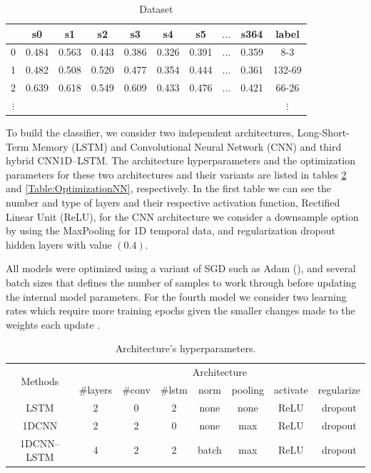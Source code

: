 \begin{table}[h]
	\centering
	\small
	\begin{tabular}[h]{|c|c|c|c|c|c|c|c|c|c|}
		\hline
		  & s0    & s1    & s2    & s3    & s4    &	s5    & $\ldots$ & s364  &   label \\ \hline
		0 & 0.484 & 0.563 & 0.443 & 0.386 & 0.326 &	0.391 & $\ldots$ & 0.359 &   8-3 \\
		1 &	0.482 &	0.508 &	0.520 &	0.477 &	0.354 &	0.444 & $\ldots$ & 0.361 & 132-69 \\
		2 &	0.639 & 0.618 &	0.549 &	0.609 &	0.433 & 0.476 & $\ldots$ & 0.421 &	66-26 \\ 
		$\vdots$  & &     &       &       &       &       &          &       & $\vdots$ \\ \hline
	\end{tabular}
	\caption{Dataset }
	\label{Table:DatasetTSC}
\end{table}

To build the classifier, we consider two independent architectures, Long-Short-Term Memory (LSTM) and Convolutional Neural Network (CNN) and third hybrid CNN1D--LSTM. The architecture hyperparameters and the optimization parameters for these two architectures and their variants are listed in tables \ref{Table:HyperparametersNN} and \ref{Table:OptimizationNN}, respectively. In the first table we can see the number and type of layers and their respective activation function, Rectified Linear Unit (ReLU), for the CNN architecture we consider a downsample option by using the MaxPooling for 1D temporal data, and regularization dropout hidden layers with value $(0.4)$.

All models were optimized using a variant of SGD such as Adam (\cite{Kingma2015}), and several batch sizes that defines the number of samples to work through before updating the internal model parameters. For the fourth model we consider two learning rates which require more training epochs given the smaller changes made to the weights each update \cite{}.

\begin{table}[h]
	\centering
	\tiny
	\begin{tabular}{|c|c|c|c|c|c|c|c|}
		\hline
		\multirow{2}{*}{Methods} & \multicolumn{7}{c|}{Architecture} \\
		\cline{2-8}
		& \#layers & \#conv & \#lstm & norm & pooling & activate & regularize \\
		\cline{2-8}
		\hline
		LSTM & 2 & 0 & 2 & none & none & ReLU & dropout \\
		\hline
		1DCNN & 2 & 2 & 0 & none & max & ReLU & dropout \\
		\hline
		1DCNN--LSTM & 4 & 2 & 2 & batch & max & ReLU & dropout  \\
		\hline
	\end{tabular}
	\caption{Architecture’s hyperparameters.}
	\label{Table:HyperparametersNN}
\end{table}

